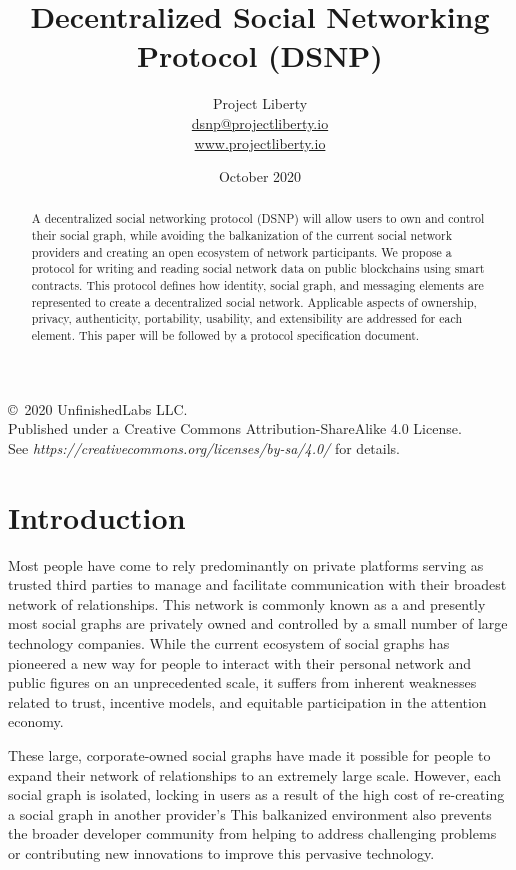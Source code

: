 \documentclass[12pt,letterpaper]{article}
\title{Decentralized Social Networking Protocol (DSNP)}
\author{
	Project Liberty\\
	\href{mailto:dsnp@projectliberty.io}{dsnp@projectliberty.io}\\
	\url{www.projectliberty.io}
}
\date{October 2020}
\begin{document}
\maketitle

\begin{abstract}
	A decentralized social networking protocol (DSNP) will allow users to own and control
	their social graph, while avoiding the balkanization of the current social network
	providers and creating an open ecosystem of network participants. We propose a protocol
	for writing and reading social network data on public blockchains using smart contracts.
	This protocol defines how identity, social graph, and messaging elements are represented
	to create a decentralized social network. Applicable aspects of ownership, privacy,
	authenticity, portability, usability, and extensibility are addressed for each element.
	This paper will be followed by a protocol specification document.
\end{abstract}

\vfill
\copyright\, 2020 UnfinishedLabs LLC.\\
Published under a Creative Commons Attribution-ShareAlike 4.0 License.\\
See \textit{https://creativecommons.org/licenses/by-sa/4.0/} for details.

\thispagestyle{empty}
\clearpage

\raggedright

\section{Introduction}\label{sec:introduction}

Most people have come to rely predominantly on private platforms serving as trusted third
parties to manage and facilitate communication with their broadest network of
relationships. This network is commonly known as a  and presently most
social graphs are privately owned and controlled by a small number of large technology
companies. While the current ecosystem of social graphs has pioneered a new way for people
to interact with their personal network and public figures on an unprecedented scale, it
suffers from inherent weaknesses related to trust, incentive models, and equitable
participation in the attention economy.

These large, corporate-owned social graphs have made it possible for people to expand
their network of relationships to an extremely large scale. However, each social graph is
isolated, locking in users as a result of the high cost of re-creating a social graph in
another provider's  This balkanized environment also prevents the
broader developer community from helping to address challenging problems or contributing
new innovations to improve this pervasive technology.
\end{document}

